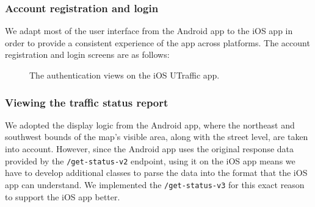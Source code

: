 \subsubsection{Account registration and login}
We adapt most of the user interface from the Android app to the iOS app in order to provide a consistent experience of the app across platforms. The account registration and login screens are as follows:
\begin{figure}[H]
    \centering
    \hspace{2cm}
    \label{fig:ios_auth_views}
    \caption{The authentication views on the iOS UTraffic app.}
\end{figure}


\subsubsection{Viewing the traffic status report}
We adopted the display logic from the Android app, where the northeast and southwest bounds of the map's visible area, along with the street level, are taken into account. However, since the Android app uses the original response data provided by the \lstinline{/get-status-v2} endpoint, using it on the iOS app means we have to develop additional classes to parse the data into the format that the iOS app can understand. We implemented the \lstinline{/get-status-v3} for this exact reason to support the iOS app better.

